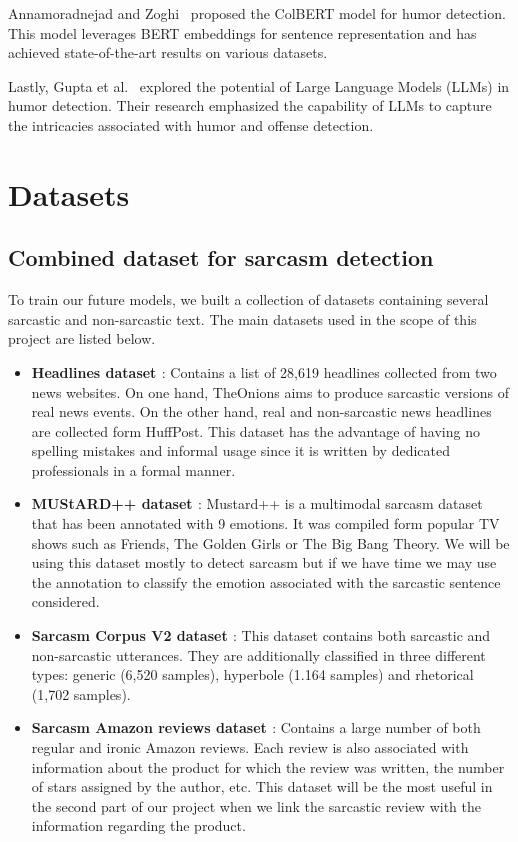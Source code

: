 \documentclass[10pt,twocolumn,letterpaper]{article}
\begin{document}
Annamoradnejad and Zoghi~\cite{annamoradnejad2020} proposed the ColBERT model for humor detection. This model leverages BERT embeddings for sentence representation and has achieved state-of-the-art results on various datasets.

Lastly, Gupta et al.~\cite{gupta2021} explored the potential of Large Language Models (LLMs) in humor detection. Their research emphasized the capability of LLMs to capture the intricacies associated with humor and offense detection.


\section{Datasets}
\subsection{Combined dataset for sarcasm detection}

To train our future models, we built a collection of datasets containing several sarcastic and non-sarcastic text. 
The main datasets used in the scope of this project are listed below.
\begin{itemize}
    \item {\bfseries Headlines dataset \cite{misra2019}}: Contains a list of 28,619 headlines collected from two news websites.
    On one hand, TheOnions aims to produce sarcastic versions of real news events.
    On the other hand, real and non-sarcastic news headlines are collected form HuffPost. This dataset has the advantage of having no spelling mistakes and informal usage since it is written by dedicated professionals in a formal manner.
    \item {\bfseries MUStARD++ dataset \cite{mustard2022}}: Mustard++ is a multimodal sarcasm dataset that has been annotated with 9 emotions.
    It was compiled form popular TV shows such as Friends, The Golden Girls or The Big Bang Theory. We will be using this dataset mostly to detect sarcasm but if we have time we may use the annotation to classify the emotion associated with the sarcastic sentence considered.
    \item {\bfseries Sarcasm Corpus V2 dataset \cite{oraby2016}}: This dataset contains both sarcastic and non-sarcastic utterances.
    They are additionally classified in three different types: generic (6,520 samples), hyperbole (1.164 samples) and rhetorical (1,702 samples).
    \item {\bfseries Sarcasm Amazon reviews dataset \cite{filatova2012}}: Contains a large number of both regular and ironic Amazon reviews.
    Each review is also associated with information about the product for which the review was written, the number of stars assigned by the author, etc.
    This dataset will be the most useful in the second part of our project when we link the sarcastic review with the information regarding the product.
\end{itemize}
\end{document}
